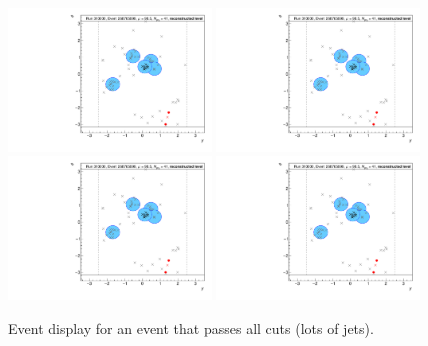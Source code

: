 \begin{figure}[h!]
  \centering
  \includegraphics[page=96,width=0.48\textwidth]{figures/EventDisplays.pdf}
  \includegraphics[page=97,width=0.48\textwidth]{figures/EventDisplays.pdf} \\
  \includegraphics[page=99,width=0.48\textwidth]{figures/EventDisplays.pdf}
  \includegraphics[page=100,width=0.48\textwidth]{figures/EventDisplays.pdf}
  \caption{Event display for an event that passes all cuts (lots of jets).}
  \label{fig:event-display-6}
\end{figure}

